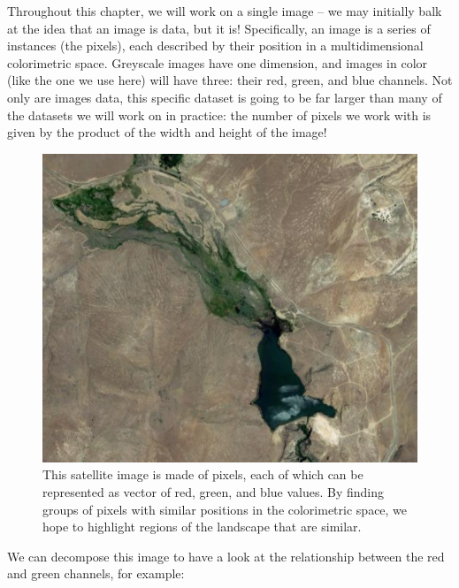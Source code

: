 \documentclass[
  letterpaper,
]{scrbook}
\begin{document}
Throughout this chapter, we will work on a single image -- we may
initially balk at the idea that an image is data, but it is!
Specifically, an image is a series of instances (the pixels), each
described by their position in a multidimensional colorimetric space.
Greyscale images have one dimension, and images in color (like the one
we use here) will have three: their red, green, and blue channels. Not
only are images data, this specific dataset is going to be far larger
than many of the datasets we will work on in practice: the number of
pixels we work with is given by the product of the width and height of
the image!

\begin{figure}

{\centering \includegraphics{data/kmeans/landscape.png}

}

\caption{This satellite image is made of pixels, each of which can be
represented as vector of red, green, and blue values. By finding groups
of pixels with similar positions in the colorimetric space, we hope to
highlight regions of the landscape that are similar.}

\end{figure}

We can decompose this image to have a look at the relationship between
the red and green channels, for example:
\end{document}
